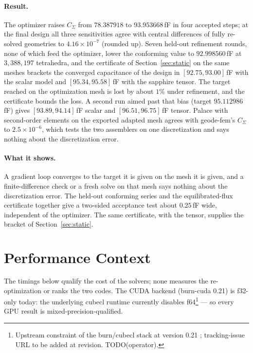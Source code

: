 \documentclass{anvil-paper}
\begin{document}
\paragraph{Result.}
The optimizer raises $C_\Sigma$ from $78.387918$ to $93.953668$\,fF in four
accepted steps; at the final design all three sensitivities agree with
central differences of fully re-solved geometries to $4.16\times10^{-7}$
(rounded up). Seven held-out refinement rounds, none of which feed the
optimizer, lower the conforming value to $92.998560$\,fF at
$3{,}388{,}197$ tetrahedra, and the certificate of
Section~\ref{sec:static} on the same meshes brackets the converged
capacitance of the design in $[92.75, 93.00]$\,fF with the scalar model
and $[95.34, 95.58]$\,fF with the sapphire tensor. The target reached on
the optimization mesh is lost by about $1\%$ under refinement, and the
certificate bounds the loss. A second run aimed past that bias
(target $95.112986$\,fF) gives $[93.89, 94.14]$\,fF scalar and
$[96.51, 96.75]$\,fF tensor. Palace with second-order elements on the
exported adapted mesh agrees with geode-fem's $C_\Sigma$ to
$2.5\times10^{-6}$, which tests the two assemblers on one discretization
and says nothing about the discretization error.

\paragraph{What it shows.}
A gradient loop converges to the target it is given on the mesh it is
given, and a finite-difference check or a fresh solve on that mesh says
nothing about the discretization error. The held-out conforming series
and the equilibrated-flux certificate together give a two-sided
acceptance test about $0.25$\,fF wide, independent of the optimizer. The
same certificate, with the tensor, supplies the bracket of
Section~\ref{sec:static}.

\section{Performance Context}
\label{sec:appendix-perf}

The timings below qualify the cost of the solvers; none measures the
re-optimization or ranks the two codes. The CUDA
backend (burn-cuda 0.21) is f32-only today: the underlying cubecl runtime
currently disables f64\footnote{Upstream constraint of the burn/cubecl
stack at version 0.21 \citep{burn}; tracking-issue URL to be added at
revision. TODO(operator).} --- so every GPU result is
mixed-precision-qualified.
\end{document}
